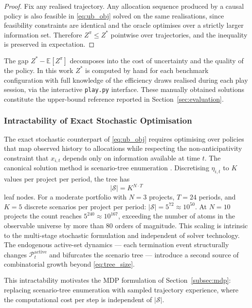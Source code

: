 \begin{proof}
Fix any realised trajectory. Any allocation sequence produced by a
causal policy is also feasible in \eqref{eq:ub_obj} solved on the
same realisations, since feasibility constraints are identical and the
oracle optimises over a strictly larger information set. Therefore
$Z^\pi \leq Z^*$ pointwise over trajectories, and the inequality
is preserved in expectation.
\end{proof}

The gap $Z^* - \mathbb{E}[Z^\pi]$ decomposes into the cost of
uncertainty and the quality of the policy. In this work $Z^*$ is
computed by hand for each benchmark configuration with full knowledge
of the efficiency draws realised during each play session, via the
interactive \texttt{play.py} interface. These manually obtained
solutions constitute the upper-bound reference reported in
Section~\ref{sec:evaluation}.

\subsubsection{Intractability of Exact Stochastic Optimisation}
\label{subsubsec:intractability}

The exact stochastic counterpart of \eqref{eq:ub_obj} requires
optimising over policies that map observed history to allocations
while respecting the non-anticipativity constraint that $x_{i,t}$
depends only on information available at time $t$. The canonical
solution method is scenario-tree enumeration \citep{Birge2011}.
Discretising $\eta_{i,t}$ to $K$ values per project per period, the
tree has
\begin{equation}
  |\mathcal{S}| = K^{N \cdot T}
  \label{eq:tree_size}
\end{equation}
leaf nodes. For a moderate portfolio with $N = 3$ projects, $T = 24$
periods, and $K = 5$ discrete scenarios per project per period:
$|\mathcal{S}| = 5^{72} \approx 10^{50}$. At $N = 10$ projects the
count reaches $5^{240} \approx 10^{167}$, exceeding the number of
atoms in the observable universe by more than 80 orders of magnitude.
This scaling is intrinsic to the multi-stage stochastic formulation
and independent of solver technology. The endogenous active-set
dynamics --- each termination event structurally changes
$\mathcal{P}_t^{\mathrm{active}}$ and bifurcates the scenario tree
--- introduce a second source of combinatorial growth beyond
\eqref{eq:tree_size}.

This intractability motivates the MDP formulation of
Section~\ref{subsec:mdp}: replacing scenario-tree enumeration with
sampled trajectory experience, where the computational cost per step
is independent of $|\mathcal{S}|$.

